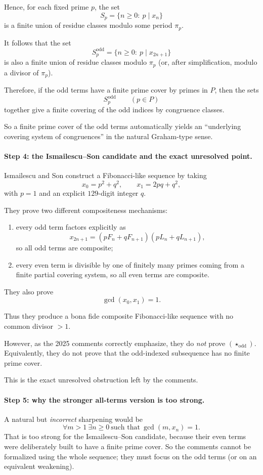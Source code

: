 Hence, for each fixed prime $p$, the set
\[
S_p=\{n\ge 0:\ p\mid x_n\}
\]
is a finite union of residue classes modulo some period $\pi_p$.

It follows that the set
\[
S^{\mathrm{odd}}_p=\{n\ge 0:\ p\mid x_{2n+1}\}
\]
is also a finite union of residue classes modulo $\pi_p$ (or, after simplification, modulo a divisor of $\pi_p$).

Therefore, if the odd terms have a finite prime cover by primes in $P$, then the sets
\[
S^{\mathrm{odd}}_p \qquad (p\in P)
\]
together give a finite covering of the odd indices by congruence classes.

So a finite prime cover of the odd terms automatically yields an ``underlying covering system of congruences'' in the natural Graham-type sense.

\paragraph{Step 4: the Ismailescu--Son candidate and the exact unresolved point.}
Ismailescu and Son construct a Fibonacci-like sequence by taking
\[
x_0=p^2+q^2,\qquad x_1=2pq+q^2,
\]
with $p=1$ and an explicit $129$-digit integer $q$.

They prove two different compositeness mechanisms:

\begin{enumerate}
\item every odd term factors explicitly as
\[
x_{2n+1}=(pF_n+qF_{n+1})(pL_n+qL_{n+1}),
\]
so all odd terms are composite;
\item every even term is divisible by one of finitely many primes coming from a finite partial covering system, so all even terms are composite.
\end{enumerate}

They also prove
\[
\gcd(x_0,x_1)=1.
\]

Thus they produce a bona fide composite Fibonacci-like sequence with no common divisor $>1$.

However, as the 2025 comments correctly emphasize, they do \emph{not} prove $(\star_{\mathrm{odd}})$.  Equivalently, they do not prove that the odd-indexed subsequence has no finite prime cover.

This is the exact unresolved obstruction left by the comments.

\paragraph{Step 5: why the stronger all-terms version is too strong.}
A natural but \emph{incorrect} sharpening would be
\[
\forall m>1\ \exists n\ge 0\ \mbox{such that}\ \gcd(m,x_n)=1.
\]
That is too strong for the Ismailescu--Son candidate, because their even terms were deliberately built to have a finite prime cover.  So the comments cannot be formalized using the whole sequence; they must focus on the odd terms (or on an equivalent weakening).

